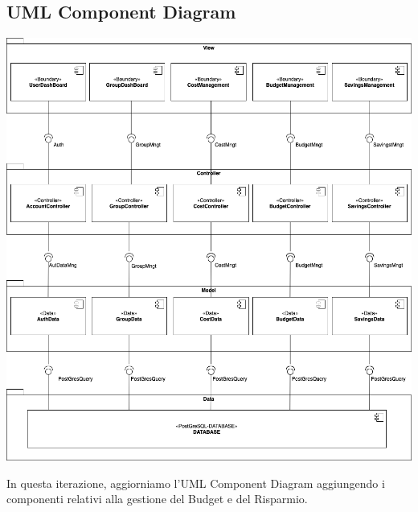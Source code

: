 \subsection{UML Component Diagram}

\begin{center}
    \includegraphics[scale=0.4]{images/ComponentDiagramV1.4.png}
\end{center}

In questa iterazione, aggiorniamo l'UML Component Diagram aggiungendo i componenti relativi alla gestione del Budget e del Risparmio. 
